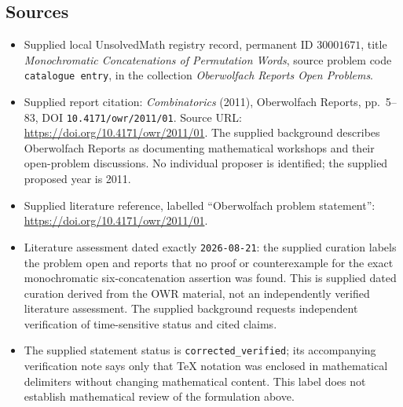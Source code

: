 \documentclass[11pt]{article}
\begin{document}
\subsection{Sources}
\begin{itemize}
\item Supplied local UnsolvedMath registry record, permanent ID \(30001671\), title \emph{Monochromatic Concatenations of Permutation Words}, source problem code \texttt{catalogue entry}, in the collection \emph{Oberwolfach Reports Open Problems}.
\item Supplied report citation: \emph{Combinatorics} (2011), Oberwolfach Reports, pp.\ 5--83, DOI \texttt{10.4171/owr/2011/01}. Source URL: \url{https://doi.org/10.4171/owr/2011/01}. The supplied background describes Oberwolfach Reports as documenting mathematical workshops and their open-problem discussions. No individual proposer is identified; the supplied proposed year is 2011.
\item Supplied literature reference, labelled ``Oberwolfach problem statement'': \url{https://doi.org/10.4171/owr/2011/01}.
\item Literature assessment dated exactly \texttt{2026-08-21}: the supplied curation labels the problem open and reports that no proof or counterexample for the exact monochromatic six-concatenation assertion was found. This is supplied dated curation derived from the OWR material, not an independently verified literature assessment. The supplied background requests independent verification of time-sensitive status and cited claims.
\item The supplied statement status is \texttt{corrected\_verified}; its accompanying verification note says only that TeX notation was enclosed in mathematical delimiters without changing mathematical content. This label does not establish mathematical review of the formulation above.
\end{itemize}
\end{document}
